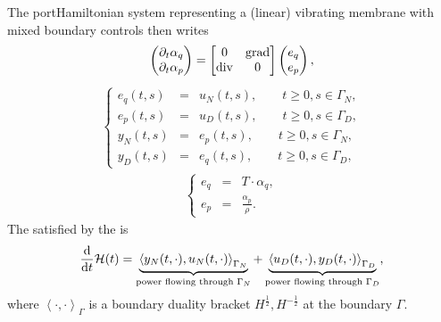 \documentclass[letterpaper,10pt,english]{sphinxmanual}
\begin{document}
\sphinxAtStartPar
The port\sphinxhyphen{}Hamiltonian system representing a (linear) vibrating membrane
with mixed boundary controls then writes
\begin{equation*}
\begin{split}\begin{pmatrix} \partial_t \alpha_q \\ \partial_t \alpha_p \end{pmatrix}
=
\begin{bmatrix} 0 & {\rm grad} \\ {\rm div} & 0 \end{bmatrix}
\begin{pmatrix} e_q \\ e_p \end{pmatrix},\end{split}
\end{equation*}\begin{equation*}
\begin{split}\left\lbrace
\begin{array}{rcl}
e_q(t,s) &=& u_N(t,s), \qquad t \ge 0, s \in \Gamma_N, \\
e_p(t,s) &=& u_D(t,s), \qquad t \ge 0, s \in \Gamma_D, \\
y_N(t,s) &=& e_p(t,s), \qquad t \ge 0, s \in \Gamma_N, \\
y_D(t,s) &=& e_q(t,s), \qquad t \ge 0, s \in \Gamma_D,
\end{array}
\right.\end{split}
\end{equation*}\begin{equation*}
\begin{split}\left\lbrace
\begin{array}{rcl}
e_q &=& T \cdot \alpha_q, \\
e_p &=& \frac{\alpha_p}{\rho}.
\end{array}
\right.\end{split}
\end{equation*}
\sphinxAtStartPar
The  satisfied by the  is
\begin{equation*}
\begin{split}\frac{\rm d}{{\rm d}t} \mathcal{H}(t) = \underbrace{\left\langle y_N(t,\cdot), u_N(t,\cdot)\right\rangle_{\Gamma_N}}_{\text{power flowing through }\Gamma_N} + \underbrace{\left\langle u_D(t,\cdot), y_D(t,\cdot) \right\rangle_{\Gamma_D}}_{\text{power flowing through }\Gamma_D},\end{split}
\end{equation*}
\sphinxAtStartPar
where \(\left\langle \cdot, \cdot \right\rangle_{\Gamma}\) is a
boundary duality bracket \(H^\frac12, H^{-\frac12}\) at the boundary
\(\Gamma\).
\end{document}
